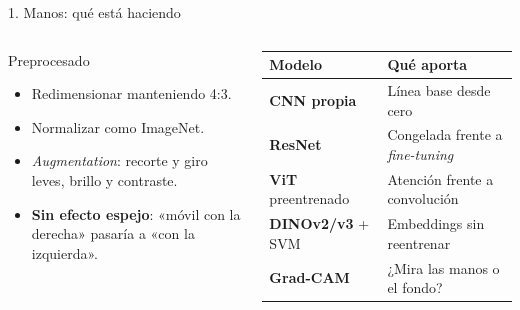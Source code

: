 \documentclass[aspectratio=169,9pt,t,xcolor={table}]{beamer}
\begin{document}
\begin{frame}{1. Manos: qué está haciendo}
\vspace{3mm}
\begin{columns}[T,onlytextwidth]
\begin{caja}{Preprocesado}
\small
\begin{itemize}\setlength{\itemsep}{0.6mm}
  \item Redimensionar manteniendo 4:3.
  \item Normalizar como ImageNet.
  \item \textit{Augmentation}: recorte y giro leves, brillo y contraste.
  \item \textbf{Sin efecto espejo}: «móvil con la derecha» pasaría a «con la izquierda».
\end{itemize}
\end{caja}
\centering\footnotesize
\setlength{\tabcolsep}{4pt}
\begin{tabular}{|p{33mm}|p{30mm}|}
\hline
\textbf{Modelo} & \textbf{Qué aporta} \\ \hline
\textbf{CNN propia} & Línea base desde cero \\ \hline
\textbf{ResNet} & Congelada frente a \textit{fine-tuning} \\ \hline
\textbf{ViT} preentrenado & Atención frente a convolución \\ \hline
\textbf{DINOv2/v3} + SVM & Embeddings sin reentrenar \\ \hline
\textbf{Grad-CAM} & ¿Mira las manos o el fondo? \\ \hline
\end{tabular}
\end{columns}
\end{frame}
\end{document}
